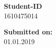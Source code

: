 \begin{center}
\vspace{0.65cm}

\hspace*{-1.0cm} \textbf{Student-ID}\\
\hspace*{-1.0cm} 1610475014 \\






\vspace{1.4cm}

\hspace*{-1.0cm} \textbf{Submitted on:} \\
\hspace*{-1.0cm} 01.01.2019 \\

\end{center}











